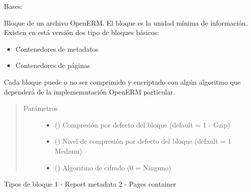 \documentclass[a4paper,12pt,spanish]{sphinxmanual}
\begin{document}
\begin{fulllineitems}
\label{\detokenize{openerm.Block:openerm.Block.Block}}
Bases: 

Bloque de un archivo OpenERM. El bloque es la unidad mínima de
información. Existen en está versión dos tipo de bloques básicos:
\begin{itemize}
\item {} 
Contenedores de metadatos

\item {} 
Contenedores de páginas

\end{itemize}

Cada bloque puede o no ser comprimido y encriptado con algún algoritmo que
dependerá de la implememntación OpenERM particular.
\begin{quote}\begin{description}
\item[{Parámetros}] \leavevmode\begin{itemize}
\item {} 
 () \textendash{} Compresión por defecto del bloque (default = 1 - Gzip)

\item {} 
 () \textendash{} Nivel de compresión por defecto del bloque (default = 1 Medium)

\item {} 
 () \textendash{} Algoritmo de cifrado (0 = Ninguno)

\end{itemize}

\end{description}\end{quote}

\begin{fulllineitems}
\label{\detokenize{openerm.Block:openerm.Block.Block.block_types}}
Tipos de bloque
1 - Report metadata
2 - Pages container


\end{fulllineitems}
\end{fulllineitems}
\end{document}
